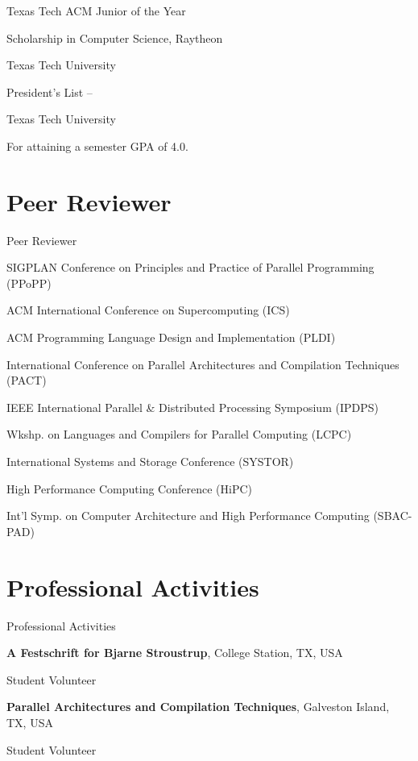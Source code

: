 \documentclass[a4paper,10pt,oneside]{article}
\begin{document}
\begin{body}
\EntryGap
Texas Tech ACM Junior of the Year
\hfill
{}

\EntryGap
Scholarship in Computer Science,
Raytheon
\hfill
{}
\par
Texas Tech University

\EntryGap
President's List
\hfill
{} --
\par
Texas Tech University
\begin{detail}
For attaining a semester GPA of 4.0.
\end{detail}





\section{Peer Reviewer}
{Peer Reviewer}

SIGPLAN Conference on Principles and Practice of Parallel Programming (PPoPP)
\par ACM International Conference on Supercomputing (ICS)
\par ACM Programming Language Design and Implementation (PLDI)
\par International Conference on Parallel Architectures and Compilation Techniques (PACT)
\par IEEE International Parallel \& Distributed Processing Symposium (IPDPS)
\par Wkshp. on Languages and Compilers for Parallel Computing (LCPC)
\par International Systems and Storage Conference (SYSTOR)
\par High Performance Computing Conference (HiPC)
\par Int'l Symp. on Computer Architecture and High Performance Computing (SBAC-PAD)


\section{Professional Activities}
{Professional Activities}

{\textbf{A Festschrift for Bjarne Stroustrup}, College Station, TX, USA }
\par
Student Volunteer
\hfill
{}

\EntryGap


{\textbf{Parallel Architectures and Compilation Techniques}, Galveston Island, TX, USA }
\par
Student Volunteer
\hfill
{}



\end{body}
\end{document}
